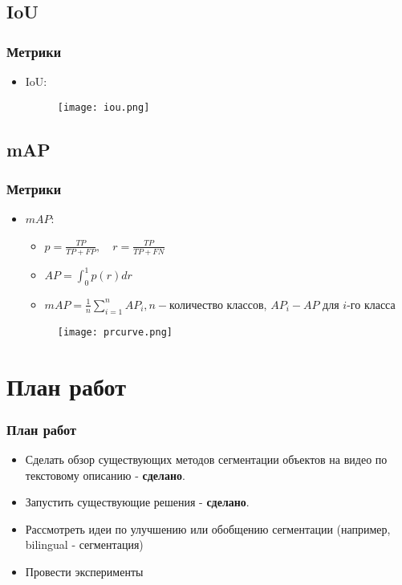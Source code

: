 \subsection{IoU}
\begin{frame}
    \frametitle{Метрики}
    \begin{itemize}
        \item IoU:
         \begin{figure}
            \texttt{[image: iou.png]}
        \end{figure}
        
    \end{itemize}
\end{frame}
\subsection{mAP}
\begin{frame}
    \frametitle{Метрики}
    \begin{itemize}
        \item \(mAP\):
        \begin{itemize}
            \item \(p=\frac{TP}{TP+FP}, \quad r=\frac{TP}{TP+FN}\)
            \item \(AP=\int_{0}^{1}p(r)dr\)
            \item \(mAP=\frac{1}{n}\sum_{i=1}^{n}AP_{i}, n -\)количество классов, \(AP_{i} - AP\) для \(i\)-го класса
        \end{itemize}

        \begin{figure}
            \texttt{[image: prcurve.png]}
        \end{figure}
    \end{itemize}
\end{frame}

\section{План работ}
\begin{frame}
    \frametitle{План работ}
    \begin{itemize}      
        \item Сделать обзор существующих методов сегментации объектов на видео по текстовому описанию - \textbf{сделано}.
        \item Запустить существующие решения - \textbf{сделано}.
        \item Рассмотреть идеи по улучшению или обобщению сегментации (например, bilingual - сегментация)
        \item Провести эксперименты
      
    \end{itemize}
\end{frame}


\begin{frame}
    \begin{center}
    \end{center}
\end{frame}